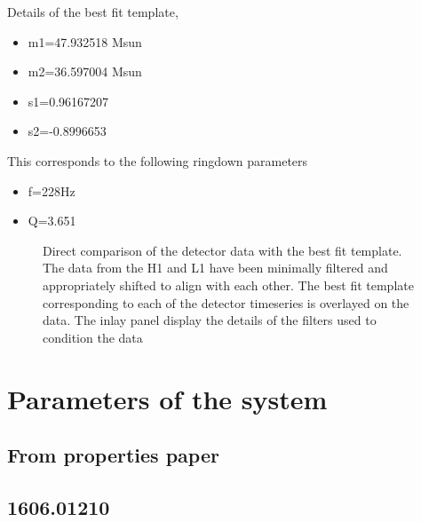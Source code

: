 {Details of the best fit template,

\begin{itemize}
\item m1=47.932518 Msun
\item m2=36.597004 Msun
\item s1=0.96167207
\item  s2=-0.8996653
\end{itemize}

This corresponds to the following ringdown parameters

\begin{itemize}
\item f=228Hz
\item Q=3.651
\end{itemize}





\begin{figure}
\caption{Direct comparison of the detector data with the best fit template. The data from the H1 and L1 have been minimally filtered and  appropriately shifted to align with each other. The best fit template corresponding to each of the detector timeseries is overlayed on the data. The inlay panel display the details of the filters used to condition the data}
\label{fig:overlayGW150914}
\end{figure}
}


\section{Parameters of the system}
\subsection{From properties paper}
\subsection{1606.01210}

